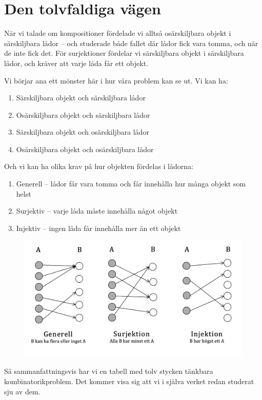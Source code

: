 \documentclass[nobib]{tufte-handout}
\begin{document}
\section{Den tolvfaldiga vägen}

När vi talade om kompositioner fördelade vi alltså osärskiljbara objekt i särskiljbara lådor -- och studerade både fallet där lådor fick vara tomma, och när de inte fick det. För surjektioner fördelar vi särskiljbara objekt i särskiljbara lådor, och kräver att varje låda får ett objekt.

Vi börjar ana ett mönster här i hur våra problem kan se ut. Vi kan ha:
\begin{enumerate}
  \item Särskiljbara objekt och särskiljbara lådor
  \item Osärskiljbara objekt och särskiljbara lådor
  \item Särskiljbara objekt och osärskiljbara lådor
  \item Osärskiljbara objekt och osärskiljbara lådor
\end{enumerate}
Och vi kan ha olika krav på hur objekten fördelas i lådorna:
\begin{enumerate}
  \item Generell -- lådor får vara tomma och får innehålla hur många objekt som helst
  \item Surjektiv -- varje låda måste innehålla något objekt
  \item Injektiv -- ingen låda får innehålla mer än ett objekt
\end{enumerate}
\begin{figure}[h]
\includegraphics[width=130mm]{bild.png}
\end{figure}
Så sammanfattningsvis har vi en tabell med tolv stycken tänkbara kombinatorikproblem. Det kommer visa sig att vi i själva verket redan studerat sju av dem.
\end{document}
